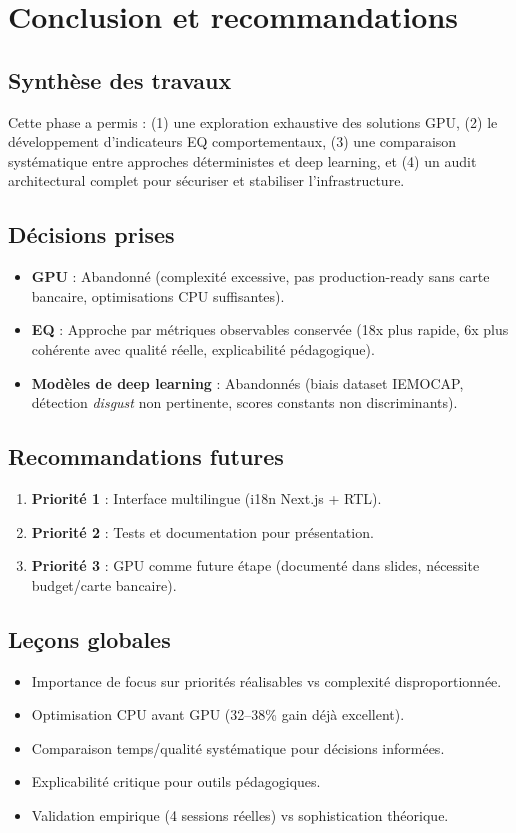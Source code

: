 \documentclass[12pt,a4paper]{article}
\begin{document}
\section{Conclusion et recommandations}

\subsection{Synthèse des travaux}
Cette phase a permis : (1) une exploration exhaustive des solutions GPU, (2) le développement d'indicateurs EQ comportementaux, (3) une comparaison systématique entre approches déterministes et deep learning, et (4) un audit architectural complet pour sécuriser et stabiliser l'infrastructure.

\subsection{Décisions prises}
\begin{itemize}
    \item \textbf{GPU} : Abandonné (complexité excessive, pas production-ready sans carte bancaire, optimisations CPU suffisantes).
    \item \textbf{EQ} : Approche par métriques observables conservée (18x plus rapide, 6x plus cohérente avec qualité réelle, explicabilité pédagogique).
    \item \textbf{Modèles de deep learning} : Abandonnés (biais dataset IEMOCAP, détection \textit{disgust} non pertinente, scores constants non discriminants).
\end{itemize}

\subsection{Recommandations futures}
\begin{enumerate}
    \item \textbf{Priorité 1} : Interface multilingue (i18n Next.js + RTL).
    \item \textbf{Priorité 2} : Tests et documentation pour présentation.
    \item \textbf{Priorité 3} : GPU comme future étape (documenté dans slides, nécessite budget/carte bancaire).
\end{enumerate}

\subsection{Leçons globales}
\begin{itemize}
    \item Importance de focus sur priorités réalisables vs complexité disproportionnée.
    \item Optimisation CPU avant GPU (32--38\% gain déjà excellent).
    \item Comparaison temps/qualité systématique pour décisions informées.
    \item Explicabilité critique pour outils pédagogiques.
    \item Validation empirique (4 sessions réelles) vs sophistication théorique.
\end{itemize}
\end{document}

